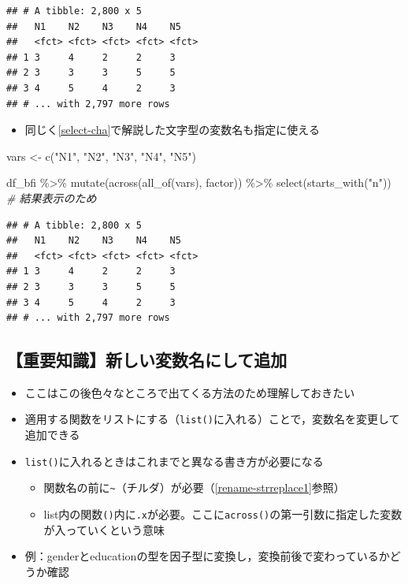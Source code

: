 \documentclass[
  xelatex,ja=standard, b5paper]{bxjsbook}
\newenvironment{Shaded}{\begin{snugshade}}{\end{snugshade}}
\newcommand{\CommentTok}[1]{\textcolor[rgb]{0.56,0.35,0.01}{\textit{#1}}}
\newcommand{\FunctionTok}[1]{\textcolor[rgb]{0.00,0.00,0.00}{#1}}
\newcommand{\NormalTok}[1]{#1}
\newcommand{\OtherTok}[1]{\textcolor[rgb]{0.56,0.35,0.01}{#1}}
\newcommand{\SpecialCharTok}[1]{\textcolor[rgb]{0.00,0.00,0.00}{#1}}
\newcommand{\StringTok}[1]{\textcolor[rgb]{0.31,0.60,0.02}{#1}}
\providecommand{\tightlist}{%
  \setlength{\itemsep}{0pt}\setlength{\parskip}{0pt}}
\begin{document}
\begin{verbatim}
## # A tibble: 2,800 x 5
##   N1    N2    N3    N4    N5   
##   <fct> <fct> <fct> <fct> <fct>
## 1 3     4     2     2     3    
## 2 3     3     3     5     5    
## 3 4     5     4     2     3    
## # ... with 2,797 more rows
\end{verbatim}

\begin{itemize}
\tightlist
\item
  同じく\ref{select-cha}で解説した文字型の変数名も指定に使える
\end{itemize}

\begin{Shaded}
\begin{Highlighting}[]
\NormalTok{vars }\OtherTok{\textless{}{-}} \FunctionTok{c}\NormalTok{(}\StringTok{"N1"}\NormalTok{, }\StringTok{"N2"}\NormalTok{, }\StringTok{"N3"}\NormalTok{, }\StringTok{"N4"}\NormalTok{, }\StringTok{"N5"}\NormalTok{)}

\NormalTok{df\_bfi }\SpecialCharTok{\%\textgreater{}\%}
  \FunctionTok{mutate}\NormalTok{(}\FunctionTok{across}\NormalTok{(}\FunctionTok{all\_of}\NormalTok{(vars),}
\NormalTok{                factor)) }\SpecialCharTok{\%\textgreater{}\%} 
  \FunctionTok{select}\NormalTok{(}\FunctionTok{starts\_with}\NormalTok{(}\StringTok{"n"}\NormalTok{))   }\CommentTok{\# 結果表示のため}
\end{Highlighting}
\end{Shaded}

\begin{verbatim}
## # A tibble: 2,800 x 5
##   N1    N2    N3    N4    N5   
##   <fct> <fct> <fct> <fct> <fct>
## 1 3     4     2     2     3    
## 2 3     3     3     5     5    
## 3 4     5     4     2     3    
## # ... with 2,797 more rows
\end{verbatim}

\hypertarget{mu-across-list}{%
\subsection{【重要知識】新しい変数名にして追加}\label{mu-across-list}}

\begin{itemize}
\tightlist
\item
  ここはこの後色々なところで出てくる方法のため理解しておきたい
\item
  適用する関数をリストにする（\texttt{list()}に入れる）ことで，変数名を変更して追加できる
\item
  \texttt{list()}に入れるときはこれまでと異なる書き方が必要になる

  \begin{itemize}
  \tightlist
  \item
    関数名の前に\texttt{\textasciitilde{}}（チルダ）が必要（\ref{rename-strreplace1}参照）
  \item
    list内の関数\texttt{()}内に\texttt{.x}が必要。ここに\texttt{across()}の第一引数に指定した変数が入っていくという意味
  \end{itemize}
\item
  例：genderとeducationの型を因子型に変換し，変換前後で変わっているかどうか確認
\end{itemize}
\end{document}
